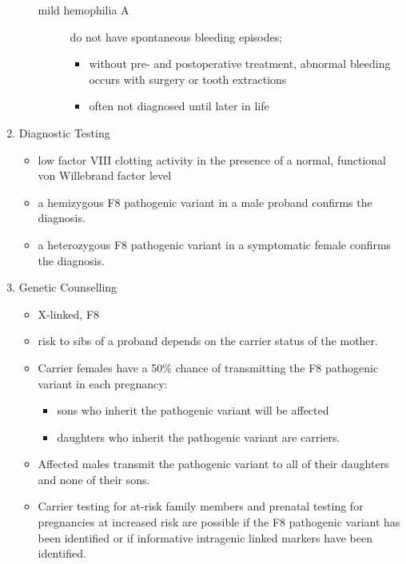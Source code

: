 \documentclass[12pt]{scrartcl}
\begin{document}
\begin{enumerate}
\begin{itemize}
\begin{description}
\item[{mild hemophilia A }] do not have spontaneous bleeding episodes;
\begin{itemize}
\item without pre- and postoperative treatment, abnormal bleeding occurs with surgery
or tooth extractions
\item often not diagnosed until later in life
\end{itemize}
\end{description}
\end{itemize}
\item Diagnostic Testing
\label{sec:orgacc9e2b}
\begin{itemize}
\item low factor VIII clotting activity in the presence of a normal,
functional von Willebrand factor level
\item a hemizygous F8 pathogenic variant in a male proband confirms the
diagnosis.
\item a heterozygous F8 pathogenic variant in a symptomatic female
confirms the diagnosis.
\end{itemize}
\item Genetic Counselling
\label{sec:org1c72020}
\begin{itemize}
\item X-linked, F8
\item risk to sibs of a proband depends on the carrier status of the mother.
\item Carrier females have a 50\% chance of transmitting the F8 pathogenic
variant in each pregnancy:
\begin{itemize}
\item sons who inherit the pathogenic variant will be affected
\item daughters who inherit the pathogenic variant are carriers.
\end{itemize}
\item Affected males transmit the pathogenic variant to all of their
daughters and none of their sons.
\item Carrier testing for at-risk family members and prenatal testing for
pregnancies at increased risk are possible if the F8 pathogenic
variant has been identified or if informative intragenic linked
markers have been identified.
\end{itemize}
\end{enumerate}
\end{document}
